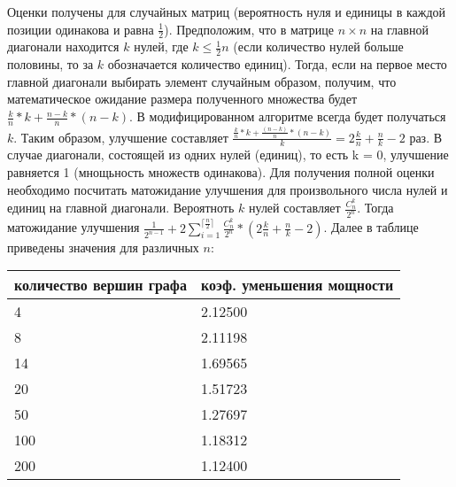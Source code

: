 Оценки получены для случайных матриц (вероятность нуля и единицы в каждой позиции
одинакова и равна $\frac{1}{2}$).
Предположим, что в матрице $n\times n$ на главной диагонали находится $k$ нулей, где $k \leq \frac{1}{2} n$ (если количество нулей больше половины, то за $k$ обозначается количество единиц).
Тогда, если на первое место главной диагонали выбирать элемент случайным образом,
получим, что математическое ожидание размера полученного множества будет $\frac{k}{n}*k + \frac{n-k}{n}*(n-k)$.
В модифицированном алгоритме всегда будет получаться $k$. Таким образом,
улучшение составляет $\frac{\frac{k}{n} * k + \frac{(n-k)}{n} * (n-k)} {k} = 2 \frac{k}{n} + \frac{n}{k} - 2$ раз. В случае диагонали,
состоящей из одних нулей (единиц), то есть k = 0, улучшение равняется 1 (мнощьность
множеств одинакова).
Для получения полной оценки необходимо посчитать матожидание улучшения для
произвольного числа нулей и единиц на главной диагонали. Вероятноть $k$ нулей
составляет $\frac{C_n^k}{2^n}$. Тогда матожидание улучшения $\frac{1}{2^{n-1}} + 2 \sum\limits_{i=1}^{\lceil\frac{n}{2}\rceil} \frac{C_n^k}{2^n} * (2\frac{k}{n} + \frac{n}{k} - 2)$.
Далее в таблице приведены значения для различных $n$:

\begin{tabular}[t]{||l|l||}
\hline
количество вершин графа & коэф. уменьшения мощности \\
\hline
4 &  2.12500 \\
8 & 2.11198 \\
14 & 1.69565 \\
20 & 1.51723 \\
50 & 1.27697 \\
100 & 1.18312 \\
200 & 1.12400 \\
\hline
\end{tabular}
